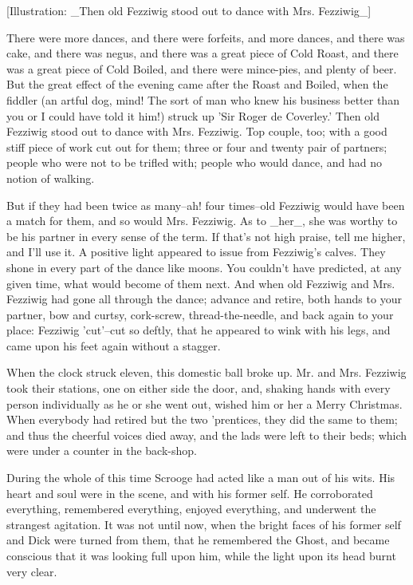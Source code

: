 [Illustration: _Then old Fezziwig stood out to dance with Mrs.
Fezziwig_]

There were more dances, and there were forfeits, and more dances, and
there was cake, and there was negus, and there was a great piece of Cold
Roast, and there was a great piece of Cold Boiled, and there were
mince-pies, and plenty of beer. But the great effect of the evening came
after the Roast and Boiled, when the fiddler (an artful dog, mind! The
sort of man who knew his business better than you or I could have told
it him!) struck up 'Sir Roger de Coverley.' Then old Fezziwig stood
out to dance with Mrs. Fezziwig. Top couple, too; with a good stiff
piece of work cut out for them; three or four and twenty pair of
partners; people who were not to be trifled with; people who would
dance, and had no notion of walking.

But if they had been twice as many--ah! four times--old Fezziwig would
have been a match for them, and so would Mrs. Fezziwig. As to _her_, she
was worthy to be his partner in every sense of the term. If that's not
high praise, tell me higher, and I'll use it. A positive light appeared
to issue from Fezziwig's calves. They shone in every part of the dance
like moons. You couldn't have predicted, at any given time, what would
become of them next. And when old Fezziwig and Mrs. Fezziwig had gone
all through the dance; advance and retire, both hands to your partner,
bow and curtsy, cork-screw, thread-the-needle, and back again to your
place: Fezziwig 'cut'--cut so deftly, that he appeared to wink with his
legs, and came upon his feet again without a stagger.

When the clock struck eleven, this domestic ball broke up. Mr. and Mrs.
Fezziwig took their stations, one on either side the door, and, shaking
hands with every person individually as he or she went out, wished him
or her a Merry Christmas. When everybody had retired but the two
'prentices, they did the same to them; and thus the cheerful voices died
away, and the lads were left to their beds; which were under a counter
in the back-shop.

During the whole of this time Scrooge had acted like a man out of his
wits. His heart and soul were in the scene, and with his former self. He
corroborated everything, remembered everything, enjoyed everything, and
underwent the strangest agitation. It was not until now, when the bright
faces of his former self and Dick were turned from them, that he
remembered the Ghost, and became conscious that it was looking full upon
him, while the light upon its head burnt very clear.

